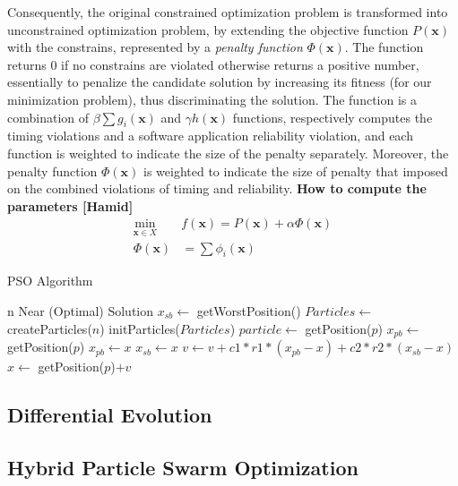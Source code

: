 Consequently, the original constrained optimization problem is transformed into unconstrained optimization problem, by extending the objective function $P(\textbf{x})$ with the constrains, represented by a \textit{penalty function} $\Phi(\textbf{x})$. The function returns 0 if no constrains are violated otherwise returns a positive number, essentially to penalize the candidate solution by increasing its fitness (for our minimization problem), thus discriminating the solution. The function is a combination of $\beta\sum{g_i(\textbf{x})}$ and $\gamma h(\textbf{x})$ functions, respectively computes the timing violations and a software application reliability violation, and each function is weighted to indicate the size of the penalty separately. Moreover, the penalty function $\Phi({\textbf{x}})$ is weighted to indicate the size of penalty that imposed on the combined violations of timing and reliability. \textbf{How to compute the parameters [Hamid]}
\begin{align}
\label{}
    \min_{\textbf{x}\in X}\;\;& f(\textbf{x})=P(\textbf{x}) + \alpha \Phi(\textbf{x})\\
    \label{eqn_penalityfunc}\Phi(\textbf{x}) &= \sum\phi_i(\textbf{x})
\end{align}

\begin{algorithm}
\caption{PSO Algorithm}\label{alg_pso}
\begin{algorithmic}[1]
\Require n
\Ensure Near (Optimal) Solution
\State $x_{sb}\leftarrow$ getWorstPosition()
\State $Particles\leftarrow$ createParticles($n$)
\State initParticles($Particles$)
    \State {}
        \State $particle \leftarrow$  getPosition($p$)
        \State $x_{pb} \leftarrow$  getPosition($p$) 
         
            \State $x_{pb}\leftarrow x$
             
                \State $x_{sb}\leftarrow x$
            \EndIf 
        \EndIf 
    \EndFor
    \State {}
        \State $v\leftarrow v+c1*r1*(x_{pb}-x)+c2*r2*(x_{sb}-x)$ 
        \State $x\leftarrow$ getPosition($p$)$ + v$
    \EndFor
\EndWhile
\end{algorithmic}
\end{algorithm}\vspace{-0.2cm}

\subsection{Differential Evolution}

\subsection{Hybrid Particle Swarm Optimization}

